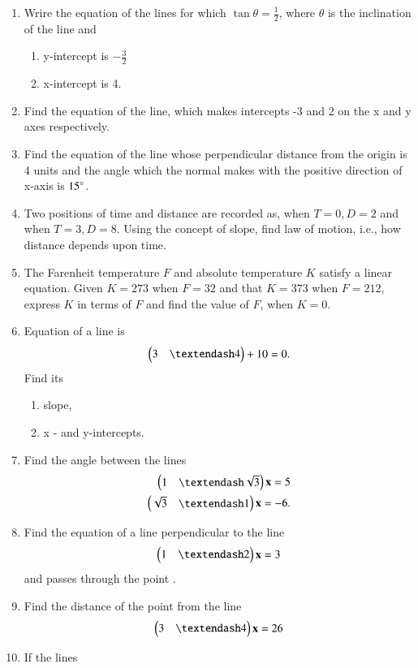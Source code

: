 \begin{enumerate}[label=\arabic*.,ref=\thesubsection.\theenumi]
\item Wrire the equation of the lines for which $\tan \theta = \frac{1}{2}$, where $\theta$ is the inclination of the line and 
\begin{enumerate}
\item y-intercept is $-\frac{3}{2}$
\item x-intercept is 4.
\end{enumerate}
\item Find the equation of the line, which makes intercepts -3 and 2 on the x and y axes respectively.
\item Find the equation of the line whose perpendicular distance from the origin is 4 units and the angle which the normal makes with the positive direction of x-axis is $15\degree$.
\item Two positions of time and distance are recorded as, when $T = 0, D = 2$ and when $T = 3, D = 8$. Using the concept of slope, find law of motion, i.e., how distance depends upon time.
\item The Farenheit temperature $F$ and absolute temperature $K$ satisfy a linear equation.  Given $K=273$ when $F=32$ and that $K=373$  when $F=212$, express $K$ in terms of $F$ and find the value of $F$, when $K=0$.
\item Equation of a line is 
\begin{align}
\myvec{3 & – 4} + 10 = 0. 
\end{align}
Find its 
\begin{enumerate}
\item  slope, 
\item  x - and y-intercepts.
\end{enumerate}
\item Find the angle between the lines 
\begin{align}
\myvec{1 & – \sqrt{3}}\vec{x}  = 5
\\
\myvec{\sqrt{3} & –1}\vec{x}  = -6
. 
\end{align}
\item Find the equation of a line perpendicular to the line 
\begin{align}
\myvec{1 & – 2}\vec{x}  = 3
\end{align}
%
and passes through the point .
\item Find the distance of the point  from the line 
\begin{align}
\myvec{3 & – 4}\vec{x}  = 26
\end{align}
\item If the lines 
\end{enumerate}
%
